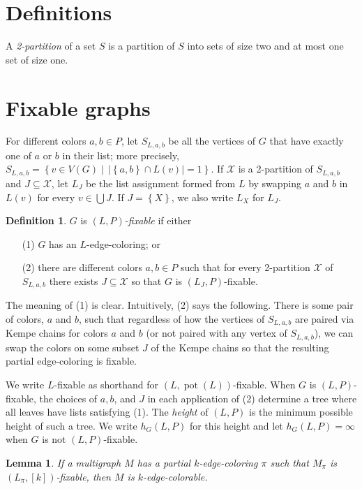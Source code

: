 \documentclass[12pt]{article}
\theoremstyle{plain}
\newtheorem{lem}[thm]{Lemma}
\theoremstyle{definition}
\newtheorem{defn}{Definition}
\theoremstyle{remark}
\newcommand{\fancy}[1]{\mathcal{#1}}
\newcommand{\set}[1]{\left\{ #1 \right\}}
\newcommand{\setb}[3]{\left\{ #1 \in #2 \mid #3 \right\}}
\newcommand{\card}[1]{\left|#1\right|}
\newcommand{\irange}[1]{\left[#1\right]}
\newcommand{\pot}{\operatorname{pot}}
\def\X{\fancy{X}}
\begin{document}
	
\section{Definitions}
A \emph{2-partition} of a set $S$ is a partition of $S$ into sets of size two and at most one set of size one.

\section{Fixable graphs}
For different colors $a,b \in P$, let $S_{L,a,b}$ be all the vertices of $G$ that have exactly one of $a$
or $b$ in their list; more precisely, $S_{L,a,b} = \setb{v}{V(G)}{\,\card{\set{a,b} \cap L(v)} = 1}$.   
 If $\X$ is a 2-partition of $S_{L,a,b}$ and $J \subseteq \X$, let $L_{J}$ be the list assignment formed
from $L$ by swapping $a$ and $b$ in $L(v)$ for every $v \in \bigcup J$.  If $J = \set{X}$, we also write $L_X$ for $L_{J}$.

\begin{defn}
$G$ is \emph{$(L, P)$-fixable} if either
\begin{enumerate}
\item[(1)] $G$ has an $L$-edge-coloring; or
\item[(2)] there are different colors $a,b \in P$ such that for every 2-partition
$\X$ of $S_{L,a,b}$ there exists $J\subseteq \X$ so that $G$ is $(L_J, P)$-fixable.
\end{enumerate}
\end{defn}

The meaning of (1) is clear.  Intuitively, (2) says the following.  There is
some pair of colors, $a$ and $b$, such that regardless of how the vertices of
$S_{L,a,b}$ are paired via Kempe chains for colors $a$ and $b$ (or not paired
with any vertex of $S_{L,a,b}$), we can swap the colors on some subset $J$ of
the Kempe chains so that the resulting partial edge-coloring is fixable.

We write $L$-fixable as shorthand for $(L, \pot(L))$-fixable. When $G$ is $(L,
P)$-fixable, the choices of $a,b$, and $J$ in each application of (2) determine
a tree where all leaves have lists satisfying (1).  The \emph{height} of $(L,
P)$ is the minimum possible height of such a tree.  We write $h_G(L, P)$ for
this height and let $h_G(L, P) = \infty$ when $G$ is not $(L,P)$-fixable. 

\begin{lem}\label{FixableCompletesColoring}
If a multigraph $M$ has a partial $k$-edge-coloring $\pi$ such that $M_\pi$ is $(L_\pi, \irange{k})$-fixable, then $M$ is $k$-edge-colorable.
\end{lem}
\end{document}
